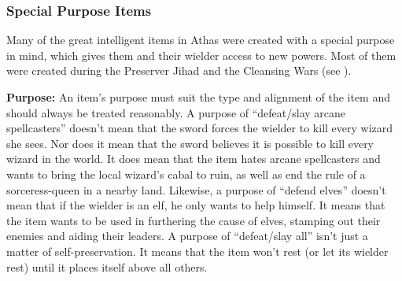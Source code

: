 \subsubsection{Special Purpose Items}
Many of the great intelligent items in Athas were created with a special purpose in mind, which gives them and their wielder access to new powers. Most of them were created during the Preserver Jihad and the Cleansing Wars (see ).

\textbf{Purpose:} An item's purpose must suit the type and alignment of the item and should always be treated reasonably. A purpose of ``defeat/slay arcane spellcasters'' doesn't mean that the sword forces the wielder to kill every wizard she sees. Nor does it mean that the sword believes it is possible to kill every wizard in the world. It does mean that the item hates arcane spellcasters and wants to bring the local wizard's cabal to ruin, as well as end the rule of a sorceress-queen in a nearby land. Likewise, a purpose of ``defend elves'' doesn't mean that if the wielder is an elf, he only wants to help himself. It means that the item wants to be used in furthering the cause of elves, stamping out their enemies and aiding their leaders. A purpose of ``defeat/slay all'' isn't just a matter of self-preservation. It means that the item won't rest (or let its wielder rest) until it places itself above all others.


